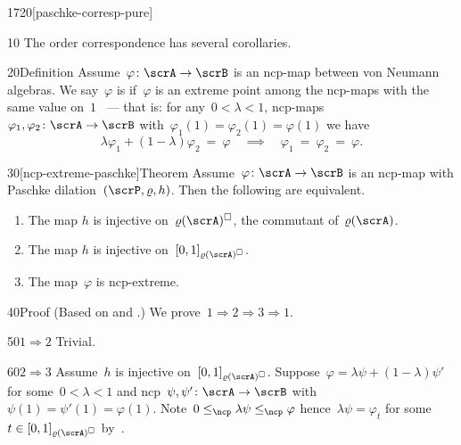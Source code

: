 \begin{parsec}{1720}[paschke-corresp-pure]%
\begin{point}{10}%
The order correspondence 
    has several corollaries.
\end{point}
\begin{point}{20}{Definition}%
Assume~$\varphi\colon \scrA \to \scrB$ is an ncp-map between von Neumann
    algebras.
We say~$\varphi$ is 
    if~$\varphi$ is an extreme point among
    the ncp-maps with the same value on~$1$~\cite{stormer1963positive}
    ---
    that is:
    for any~$0 < \lambda < 1$, ncp-maps~$\varphi_1,\varphi_2\colon \scrA \to \scrB$
    with~$\varphi_1(1) = \varphi_2(1) = \varphi(1)$
    we have
    \begin{equation*}
    \lambda \varphi_1  +  (1-\lambda)\varphi_2 \ =\  \varphi
    \quad \implies \quad
    \varphi_1\ =\ \varphi_2\ =\ \varphi.
    \end{equation*}
\end{point}
\spacingfix{}
\begin{point}{30}[ncp-extreme-paschke]{Theorem}%
Assume~$\varphi\colon \scrA \to \scrB$ is an ncp-map
    with Paschke dilation~$(\scrP, \varrho, h)$.
Then the following are equivalent.
\begin{enumerate}
    \item The map $h$ is injective on~$\varrho(\scrA)^\square$,
                the commutant of~$\varrho(\scrA)$.
    \item The map $h$ is injective on~$[0,1]_{\varrho(\scrA)^\square}$.
    \item The map~$\varphi$ is ncp-extreme.
\end{enumerate}
\spacingfix{}
\begin{point}{40}{Proof}%
(Based on \cite[prop.~1.4.6]{arveson}
    and \cite[thm.~5.4]{paschke}.)
We prove~$1 \Rightarrow 2 \Rightarrow 3 \Rightarrow 1$.
\begin{point}{50}{$1 \Rightarrow 2$}%
Trivial.
\end{point}
\begin{point}{60}{$2 \Rightarrow 3$}%
Assume~$h$ is injective on~$[0,1]_{\varrho(\scrA)^\square}$.
Suppose~$\varphi = \lambda \psi + (1 - \lambda) \psi'$
    for some~$0 < \lambda < 1$
    and ncp~$\psi,\psi'\colon \scrA \to \scrB$
    with~$\psi(1) = \psi'(1) = \varphi(1)$.
Note~$0 \leq_\ncp \lambda\psi \leq_\ncp \varphi$
hence~$\lambda\psi = \varphi_t$ for some~$t \in [0,1]_{\varrho(\scrA)^\square}$
by~.

\end{point}
\end{point}
\end{point}
\end{parsec}
